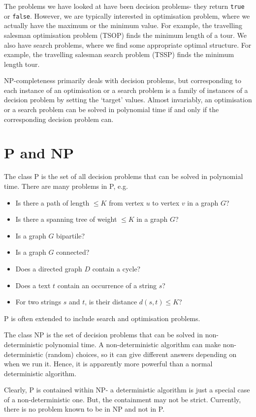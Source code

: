 \documentclass[a4paper, openany]{memoir}
\begin{document}
The problems we have looked at have been decision problems- they return \texttt{true} or \texttt{false}. However, we are typically interested in optimisation problem, where we actually have the maximum or the minimum value. For example, the travelling salesman optimisation problem (TSOP) finds the minimum length of a tour. We also have search problems, where we find some appropriate optimal structure. For example, the travelling salesman search problem (TSSP) finds the minimum length tour. 

NP-completeness primarily deals with decision problems, but corresponding to each instance of an optimisation or a search problem is a family of instances of a decision problem by setting the `target' values. Almost invariably, an optimisation or a search problem can be solved in polynomial time if and only if the corresponding decision problem can.
\newpage

\section{P and NP}
The class P is the set of all decision problems that can be solved in polynomial time. There are many problems in P, e.g.
\begin{itemize}
    \item Is there a path of length $\leq K$ from vertex $u$ to vertex $v$ in a graph $G$?
    \item Is there a spanning tree of weight $\leq K$ in a graph $G$?
    \item Is a graph $G$ bipartile?
    \item Is a graph $G$ connected?
    \item Does a directed graph $D$ contain a cycle?
    \item Does a text $t$ contain an occurrence of a string $s$?
    \item For two strings $s$ and $t$, is their distance $d(s, t) \leq K$?
\end{itemize}
P is often extended to include search and optimisation problems.

The class NP is the set of decision problems that can be solved in non-deterministic polynomial time. A non-deterministic algorithm can make non-deterministic (random) choices, so it can give different answers depending on when we run it. Hence, it is apparently more powerful than a normal deterministic algorithm.

Clearly, P is contained within NP- a deterministic algorithm is just a special case of a non-deterministic one. But, the containment may not be strict. Currently, there is no problem known to be in NP and not in P.
\end{document}
